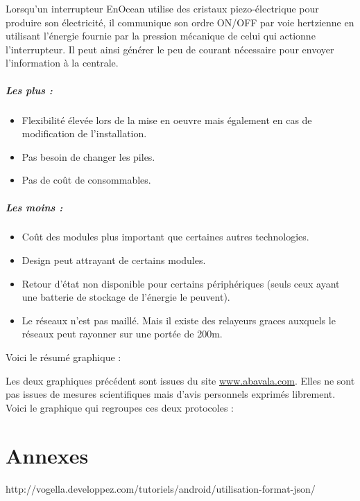 \documentclass[a4paper,10pt]{article}
\begin{document}
Lorsqu’un interrupteur EnOcean utilise des cristaux piezo-électrique pour produire son électricité, il communique son ordre ON/OFF par voie hertzienne en utilisant l’énergie fournie par la pression mécanique de celui qui actionne l’interrupteur. Il peut ainsi générer le peu de courant nécessaire pour envoyer l’information à la centrale.

\subparagraph{Les plus :}
\begin{itemize}
\item Flexibilité élevée lors de la mise en oeuvre mais également en cas de modification de l'installation.
\item Pas besoin de changer les piles.
\item Pas de coût de consommables.
\end{itemize}
\subparagraph{Les moins :}
\begin{itemize}
\item Coût des modules plus important que certaines autres technologies.
\item Design peut attrayant de certains modules.
\item Retour d'état non disponible pour certains périphériques (seuls ceux ayant une batterie de stockage de l'énergie le peuvent).
\item Le réseaux n'est pas maillé. Mais il existe des relayeurs graces auxquels le réseaux peut rayonner sur une portée de 200m.\newline
\end{itemize}


Voici le résumé graphique :

Les deux graphiques précédent sont issues du site \url{www.abavala.com}. Elles ne sont pas issues de mesures scientifiques mais d’avis personnels exprimés librement. Voici le graphique qui regroupes ces deux protocoles :


\section{Annexes}
http://vogella.developpez.com/tutoriels/android/utilisation-format-json/

 
\end{document}
